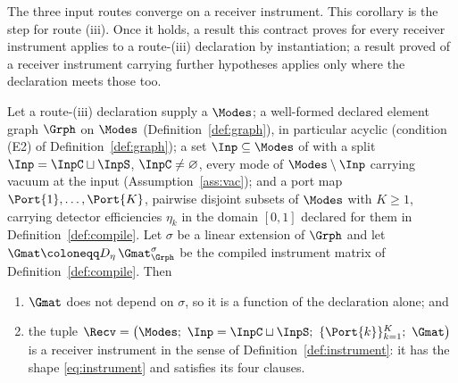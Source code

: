 
The three input routes converge on a receiver instrument. This corollary is
the step for route (iii). Once it holds, a result this contract proves for
every receiver instrument applies to a route-(iii) declaration by
instantiation; a result proved of a receiver instrument carrying further
hypotheses applies only where the declaration meets those too.

\begin{corollary}
\label{cor:compiled-instrument}
Let a route-(iii) declaration supply a  $\Modes$; a
well-formed declared element graph $\Grph$ on $\Modes$
(Definition~\ref{def:graph}), in particular acyclic
(condition (E2) of Definition~\ref{def:graph}); a set
$\Inp\subseteq\Modes$ of  with a split
$\Inp=\InpC\sqcup\InpS$, $\InpC\neq\varnothing$, every mode of $\Modes\setminus\Inp$ carrying vacuum
at the input (Assumption~\ref{ass:vac}); and a port map
$\Port{1},\dots,\Port{K}$, pairwise disjoint subsets of $\Modes$ with
$K\ge1$, carrying detector efficiencies $\eta_k$ in the domain $[0,1]$
declared for them in Definition~\ref{def:compile}. Let $\sigma$ be a linear
extension of $\Grph$ and let
$\Gmat\coloneqq D_\eta\,\Gmat^{\sigma}_{\Grph}$ be the compiled instrument
matrix of Definition~\ref{def:compile}. Then
\begin{enumerate}[label=(\roman*),leftmargin=3.0em]
\item $\Gmat$ does not depend on $\sigma$, so it is a function of the
  declaration alone; and
\item the tuple
  $\Recv=\big(\Modes;\ \Inp=\InpC\sqcup\InpS;\ \{\Port{k}\}_{k=1}^{K};\
  \Gmat\big)$ is a receiver instrument in the sense of
  Definition~\ref{def:instrument}: it has the shape \eqref{eq:instrument} and
  satisfies its four clauses.
\end{enumerate}
\end{corollary}

